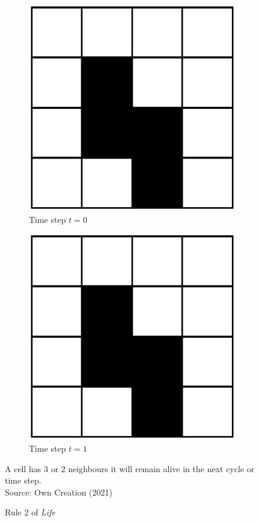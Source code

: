 \begin{figure}[H]
\centering
\begin{subfigure}{.5\textwidth}
  \centering
  \includegraphics[width=.4\linewidth]{Figures/Chapter2/rule2}
  \caption{Time step $t = 0$}
\end{subfigure}%
\begin{subfigure}{.5\textwidth}
  \centering
  \includegraphics[width=.4\linewidth]{Figures/Chapter2/rule2}
  \caption{Time step $t = 1$}
\end{subfigure}
\caption{Rule 2 of \textsl{Life}}
\begin{center}
A cell has 3 or 2 neighbours it will remain alive in the next cycle or time step.\\
Source: Own Creation (2021)
\end{center}
\end{figure}

